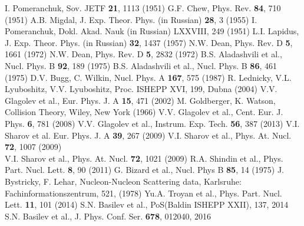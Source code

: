 \documentclass[twocolumn,epjc3]{svjour3}
\begin{document}
\begin{thebibliography}{99}
  I. Pomeranchuk, Sov. JETF \textbf{21}, 1113 (1951)
  G.F. Chew, Phys. Rev. \textbf{84}, 710 (1951)
  A.B. Migdal, J. Exp. Theor. Phys. (in Russian) \textbf{28}, 3 (1955)
  I. Pomeranchuk, Dokl. Akad. Nauk (in Russian) LXXVIII, 249 (1951)
  L.I. Lapidus, J. Exp. Theor. Phys. (in Russian) \textbf{32}, 1437 (1957)
  N.W. Dean, Phys. Rev. D \textbf{5}, 1661 (1972)
  N.W. Dean, Phys. Rev. D \textbf{5}, 2832 (1972)
  B.S. Aladashvili et al., Nucl. Phys. B \textbf{92}, 189 (1975)
  B.S. Aladashvili et al., Nucl. Phys. B \textbf{86}, 461 (1975)
  D.V. Bugg, C. Wilkin, Nucl. Phys. A \textbf{167}, 575 (1987)
  R. Lednicky, V.L. Lyuboshitz, V.V. Lyuboshitz, Proc. ISHEPP XVI, 199,
  Dubna (2004)
  V.V. Glagolev et al., Eur. Phys. J. A \textbf{15}, 471 (2002)
  M. Goldberger, K. Watson, Collision Theory, Wiley, New York (1966)
  V.V. Glagolev et al., Cent. Eur. J. Phys. \textbf{6}, 781 (2008)
  V.V. Glagolev et al., Instrum. Exp. Tech. \textbf{56}, 387 (2013)
  V.I. Sharov et al. Eur. Phys. J. A \textbf{39}, 267 (2009)
  V.I. Sharov et al., Phys. At. Nucl. \textbf{72}, 1007 (2009) \\
  V.I. Sharov et al., Phys. At. Nucl. \textbf{72}, 1021 (2009)
  R.A. Shindin et al., Phys. Part. Nucl. Lett. \textbf{8}, 90 (2011)
  G. Bizard et al., Nucl. Phys B \textbf{85}, 14 (1975)
  J. Bystricky, F. Lehar, Nucleon-Nucleon Scattering data, Karlsruhe:
  Fachinformationszentrum, 521, (1978)
  Yu.A. Troyan et al., Phys. Part. Nucl. Lett. \textbf{11}, 101 (2014)
  S.N. Basilev et al., PoS(Baldin ISHEPP XXII), 137, 2014
  S.N. Basilev et al., J. Phys. Conf. Ser. \textbf{678}, 012040, 2016
\end{thebibliography}
\end{document}
